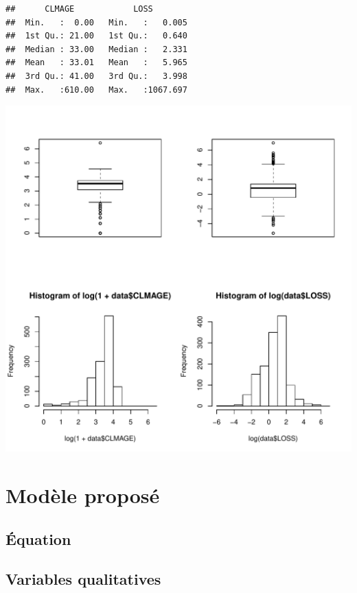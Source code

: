 \documentclass{article}\usepackage[]{graphicx}\usepackage[]{color}
\makeatletter
\def\maxwidth{ %
  \ifdim\Gin@nat@width>\linewidth
    \linewidth
  \else
    \Gin@nat@width
  \fi
}
\newenvironment{kframe}{%
 \def\at@end@of@kframe{}%
 \ifinner\ifhmode%
  \def\at@end@of@kframe{\end{minipage}}%
  \begin{minipage}{\columnwidth}%
 \fi\fi%
 \def\FrameCommand##1{\hskip\@totalleftmargin \hskip-\fboxsep
 \colorbox{shadecolor}{##1}\hskip-\fboxsep
     \hskip-\linewidth \hskip-\@totalleftmargin \hskip\columnwidth}%
 \MakeFramed {\advance\hsize-\width
   \@totalleftmargin\z@ \linewidth\hsize
   \@setminipage}}%
 {\par\unskip\endMakeFramed%
 \at@end@of@kframe}
\newenvironment{knitrout}{}{} %
\makeatother
\begin{document}
\begin{knitrout}
\color{fgcolor}\begin{kframe}
\begin{verbatim}
##      CLMAGE            LOSS         
##  Min.   :  0.00   Min.   :   0.005  
##  1st Qu.: 21.00   1st Qu.:   0.640  
##  Median : 33.00   Median :   2.331  
##  Mean   : 33.01   Mean   :   5.965  
##  3rd Qu.: 41.00   3rd Qu.:   3.998  
##  Max.   :610.00   Max.   :1067.697
\end{verbatim}
\end{kframe}
\includegraphics[width=\maxwidth]{figure/unnamed-chunk-3-1} 

\end{knitrout}



\section{Modèle proposé}
\label{sec:modele}

\subsection{Équation}
\label{ssec:equation}

\subsection{Variables qualitatives}
\label{ssec:var_qual}
\end{document}
